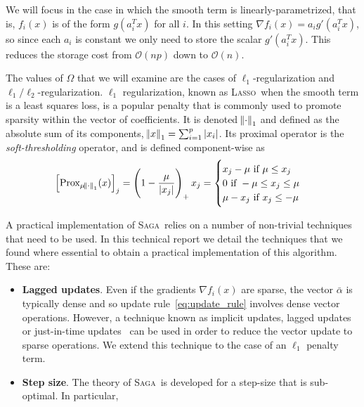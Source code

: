 \documentclass{scrartcl}
\newcommand{\SAGA}{\textsc{Saga}}
\newcommand{\LASSO}{\textsc{Lasso}}
\begin{document}
We will focus in the case in which the smooth term is linearly-parametrized, that is, $f_i(x)$ is of the form $g(a_i^T x)$ for all $i$. In this setting $\nabla f_i(x) = a_i g'(a_i^T x)$, so since each $a_i$ is constant we only need to store the scalar $g'(a_i^T x)$. This reduces the storage cost from $\mathcal{O}(n p)$ down to $\mathcal{O}(n)$.

The values of $\Omega$ that we will examine are the cases of $\ell_1$-regularization and $\ell_1/\ell_2$-regularization. $\ell_1$ regularization, known as \LASSO\ when the smooth term is a least squares loss, is a popular penalty that is commonly used to promote sparsity within the vector of coefficients. It is denoted $\norm{\cdot}_1$ and defined as the absolute sum of its components, 
$
\norm{x}_1 = \sum_{i=1}^p |x_i|
$. Its proximal operator is the \emph{soft-thresholding} operator, and is defined component-wise as
\begin{equation}\label{eq:soft_thresholding}
\left[\text{Prox}_{\mu \norm{\cdot}_1}(x)\right]_j = \left(1 - \frac{\mu}{|x_j|}\right)_+ x_j = 
\begin{cases}
x_j - \mu \text{ if } \mu \leq x_j \\
0 \text{ if } -\mu \leq x_j \leq \mu \\
\mu - x_j \text{ if }  x_j \leq - \mu \\
\end{cases}
\end{equation}

A practical implementation of \SAGA\ relies on a number of non-trivial techniques that need to be used. In this technical report we detail the techniques that we found where essential to obtain a practical implementation of this algorithm. These are:
\begin{itemize}
\item {\bf Lagged updates}. Even if the gradients $\nabla f_i(x)$ are sparse, the vector $\bar{\alpha}$ is typically dense and so update rule~\eqref{eq:update_rule} involves dense vector operations. However, a technique known as implicit updates, lagged updates~\citep{defazio2014saga} or just-in-time updates~\citep{schmidt2013minimizing} can be used in order to reduce the vector update to sparse operations. 
We extend this technique to the case of an $\ell_1$ penalty term.
\item {\bf Step size}. The theory of \SAGA\ is developed for a step-size that is sub-optimal. In particular, 
\end{itemize}
\end{document}

